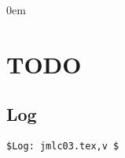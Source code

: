 \documentclass[10pt,a4page]{article}
\begin{document}
\fi

\newcommand{\sourcecodesize}[0]{\scriptsize}

\maketitle              %
\tableofcontents


\parindent0em



% 




%
%

%

\ifcase \value{mspapertype}
\newpage
\section{TODO}

\newpage

\begin{appendix}

\section{Log}  
\footnotesize

\begin{verbatim}
$Log: jmlc03.tex,v $

\end{verbatim}
\end{appendix}

\or
\makeLLNLBackCover
\or
\or
\or

\fi
\end{document}
